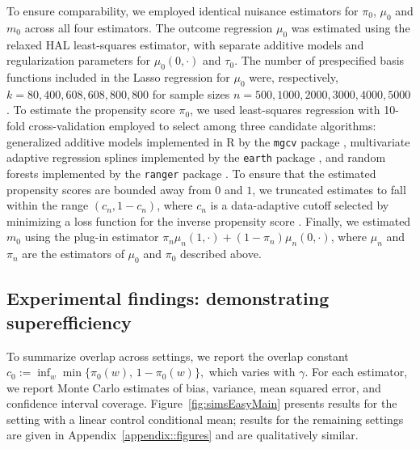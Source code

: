 \documentclass[11pt]{article}
\theoremstyle{definition}
\begin{document}
To ensure comparability, we employed identical nuisance estimators for $\pi_0$, $\mu_0$ and $m_0$ across all four estimators. The outcome regression $\mu_0$ was estimated using the relaxed HAL least-squares estimator, with separate additive models and regularization parameters for $\mu_0(0,\cdot)$ and $\tau_0$. The number of prespecified basis functions included in the Lasso regression for $\mu_0$ were, respectively, $k=80, 400, 608, 608, 800,800$ for sample sizes $n=500, 1000, 2000, 3000, 4000, 5000$. To estimate the propensity score $\pi_0$, we used least-squares regression with 10-fold cross-validation employed to select among three candidate algorithms: generalized additive models implemented in R by the \texttt{mgcv} package \citep{hastie1987generalized, wood2001mgcv}, multivariate adaptive regression splines implemented by the \texttt{earth} package \citep{friedman1991multivariate, milborrow2019package}, and random forests implemented by the \texttt{ranger} package \citep{breiman2001random,wright2015ranger}. To ensure that the estimated propensity scores are bounded away from $0$ and $1$, we truncated estimates to fall within the range $(c_n,1-c_n)$, where $c_n$ is a data-adaptive cutoff selected by minimizing a loss function for the inverse propensity score \citep{chernozhukov2022automatic}. Finally, we estimated $m_0$ using the plug-in estimator $\pi_n \mu_n(1,\cdot) + (1-\pi_n) \mu_n(0,\cdot)$, where $\mu_n$ and $\pi_n$ are the estimators of $\mu_0$ and $\pi_0$ described above. %



\subsection{Experimental findings: demonstrating superefficiency}
 

To summarize overlap across settings, we report the overlap constant $c_0 := \inf_w \min\{\pi_0(w),\,1-\pi_0(w)\},$ which varies with \(\gamma\). For each estimator, we report Monte Carlo estimates of bias, variance, mean squared error, and confidence interval coverage. Figure~\ref{fig:simsEasyMain} presents results for the setting with a linear control conditional mean; results for the remaining settings are given in Appendix~\ref{appendix::figures} and are qualitatively similar.

 
\end{document}
